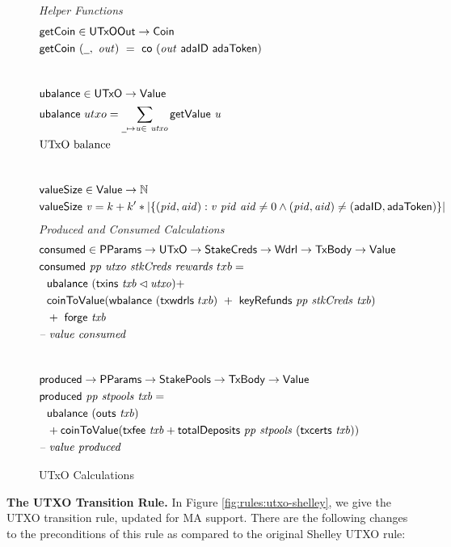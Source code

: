 \begin{figure}[htb]
  \emph{Helper Functions}
  \begin{align*}
    & \fun{getCoin} \in \UTxOOut \to \Coin \\
    & \fun{getCoin}~{(\wcard,~\var{out})} ~=~\fun{co}~(\var{out}~\mathsf{adaID}~\mathsf{adaToken}) \\
    \nextdef
    & \fun{ubalance} \in \UTxO \to \Value \\
    & \fun{ubalance} ~ utxo = \sum_{\wcard\mapsto\var{u}\in~\var{utxo}}
    \fun{getValue}~\var{u} \\
    & \text{UTxO balance} \\
    \nextdef
    & \fun{valueSize} \in \Value \to \N \\
    & \fun{valueSize}~\var{v} = k + k' * |\{ (\var{pid}, \var{aid}) : \var{v}~\var{pid}~\var{aid} \neq 0
      \land (\var{pid}, \var{aid}) \neq (\mathsf{adaID}, \mathsf{adaToken}) \}|
  \end{align*}
  \emph{Produced and Consumed Calculations}
  \begin{align*}
    & \fun{consumed} \in \PParams \to \UTxO \to \StakeCreds \to \Wdrl \to \TxBody \to \Value \\
    & \consumed{pp}{utxo}{stkCreds}{rewards}~{txb} = \\
    & ~~\ubalance{(\txins{txb} \restrictdom \var{utxo})} + \\
    &~~  \fun{coinToValue}(\fun{wbalance}~(\fun{txwdrls}~{txb})~+~ \keyRefunds{pp}{stkCreds}{txb}) \\
    &~~+~\fun{forge}~\var{txb} \\
    & \text{\emph{-- value consumed}} \\
    \nextdef
    & \fun{produced} \to \PParams \to \StakePools \to \TxBody \to \Value \\
    & \fun{produced}~\var{pp}~\var{stpools}~\var{txb} = \\
    &~~\ubalance{(\fun{outs}~{txb})} \\
    &~~+ \fun{coinToValue}(\txfee{txb} + \totalDeposits{pp}{stpools}{(\txcerts{txb})})\\
    & \text{\emph{-- value produced}} \\
  \end{align*}
  \caption{UTxO Calculations}
  \label{fig:functions:utxo}
\end{figure}

\clearpage

\textbf{The UTXO Transition Rule.}
In Figure \ref{fig:rules:utxo-shelley}, we give the UTXO transition rule,
updated for MA support. There are the following changes to the preconditions
of this rule as compared to the original Shelley UTXO rule:


